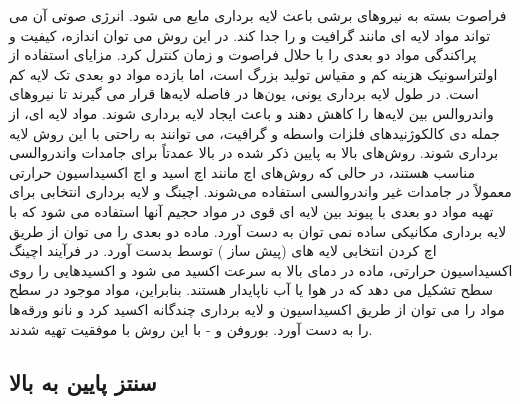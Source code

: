 فراصوت بسته به نیروهای برشی باعث لایه برداری مایع می شود. انرژی صوتی آن می تواند مواد لایه ای مانند گرافیت و  را جدا کند. در این روش می توان اندازه، کیفیت و پراکندگی مواد دو بعدی را با حلال فراصوت و زمان کنترل کرد. مزایای استفاده از اولتراسونیک هزینه کم و مقیاس تولید بزرگ است، اما بازده مواد دو بعدی تک لایه کم است. در طول لایه برداری یونی، یون‌ها در فاصله لایه‌ها قرار می گیرند تا نیروهای واندروالس بین لایه‌ها را کاهش دهند و باعث ایجاد لایه برداری شوند. مواد لایه ای، از جمله دی کالکوژنیدهای فلزات واسطه  و گرافیت، می توانند به راحتی با این روش لایه برداری شوند. روش‌های بالا به پایین ذکر شده در بالا عمدتاً برای جامدات واندروالسی مناسب هستند، در حالی که روش‌های اچ مانند اچ اسید و اچ اکسیداسیون حرارتی معمولاً در جامدات غیر واندروالسی استفاده می‌شوند. اچینگ و لایه برداری انتخابی برای تهیه مواد دو بعدی با پیوند بین لایه ای قوی در مواد حجیم آنها استفاده می شود که با لایه برداری مکانیکی ساده نمی توان به دست آورد. ماده دو بعدی  را می توان از طریق اچ کردن انتخابی لایه های  (پیش ساز ) توسط  بدست آورد. در فرآیند اچینگ اکسیداسیون حرارتی، ماده در دمای بالا به سرعت اکسید می شود و اکسیدهایی را روی سطح تشکیل می دهد که در هوا یا آب ناپایدار هستند. بنابراین، مواد موجود در سطح مواد را می توان از طریق اکسیداسیون و لایه برداری چندگانه اکسید کرد و نانو ورقه‌ها را به دست آورد.
بوروفن و - با این روش با موفقیت تهیه شدند.
\subsection{سنتز پایین به بالا}
